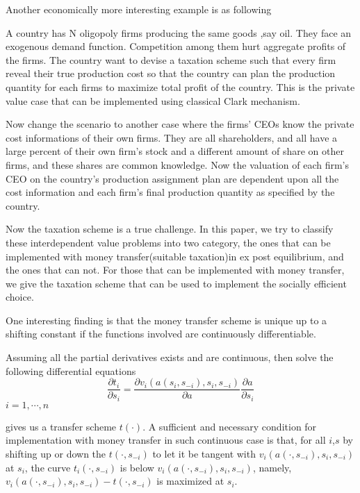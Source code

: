 \begin{prop}
Another economically more interesting example is as following 
\begin{example}
A country has N oligopoly firms producing the same goods ,say oil. They face an exogenous demand function. Competition among them hurt
aggregate profits of the firms. 
The country want to devise a taxation scheme such that every firm reveal their true production cost so that the country can plan
the production quantity for each firms to maximize total profit of the country. This is the private value case that can be implemented
using classical Clark mechanism. 
\end{example}
Now change the scenario to another case where the firms' CEOs know the private cost informations of their own firms. They are all 
shareholders, and all have a large percent of their own firm's stock and a different amount of share on other firms, and these shares
are common knowledge.  Now the valuation of each firm's CEO on the country's production assignment plan are dependent upon all
the cost information and each firm's final production quantity as specified by the country.
 
Now the taxation scheme is a true challenge. In this paper, we try to classify these interdependent value problems into two category,
the ones that can be implemented with money transfer(suitable taxation)in ex post equilibrium, and the ones that can not. For those
that can be implemented with money transfer, we give the taxation scheme that can be used to implement the socially efficient choice.

One interesting finding is that the money transfer scheme is unique up to a shifting constant if the functions involved are
continuously differentiable.

\begin{thm}
Assuming all the partial derivatives exists and are continuous, then solve the following 
differential equations
 $$\frac{\partial t_i}{\partial s_i} = \frac{\partial v_i(a(s_i,s_{-i}),s_i,s_{-i})}{\partial a } \frac{\partial a}{\partial s_i}$$
 $i=1,\cdots,n$ 
 
 gives us a transfer scheme $t(\cdot)$.
A sufficient and necessary condition for implementation with money transfer in such continuous case is that, for all $i$,$s$
by shifting up or down the $t(\cdot,s_{-i})$ to let it be tangent with $ v_i(a(\cdot,s_{-i}),s_i,s_{-i})$ at $s_i$, the curve
$t_i(\cdot,s_{-i})$ is below $ v_i(a(\cdot,s_{-i}),s_i,s_{-i})$, namely, $v_i(a(\cdot,s_{-i}),s_i,s_{-i})-t(\cdot,s_{-i})$ is
maximized at $s_i$.


\end{thm}
\end{prop}
